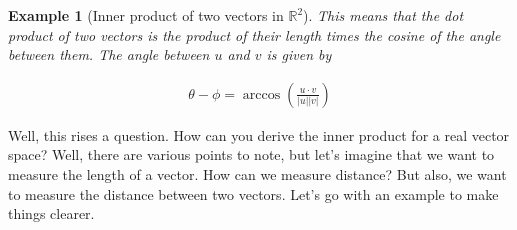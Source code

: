 \documentclass{book}
\newtheorem{example}{Example}[chapter]
\begin{document}
\begin{example}[Inner product of two vectors in $\mathbb{R}^{2}$]
    This means that the dot product of two vectors is the product of their length
    times the cosine of the angle between them. The angle between $u$ and $v$ is
    given by

    \begin{equation}
        \begin{split}
            \theta - \phi = \arccos{\left(\frac{u\cdot v}{|u| |v|}\right)}
        \end{split}
    \end{equation}

\end{example}

Well, this rises a question. How can you derive the inner product for a real
vector space? Well, there are various points to note, but let's imagine that we
want to measure the length of a vector. How can we measure distance? But also,
we want to measure the distance between two vectors. Let's go with an example
to make things clearer.
\end{document}
